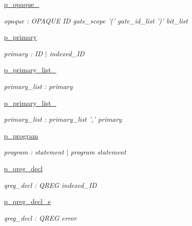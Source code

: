 \begin{DoxyCompactItemize}
\hyperlink{namespaceqat_1_1interop_1_1qasm__parser_1_1OqasmParser_1_1p__opaque__2}{p\-\_\-opaque\-\_}
\begin{DoxyCompactList}\small\item\em opaque \-: O\-P\-A\-Q\-U\-E I\-D gate\-\_\-scope '(' gate\-\_\-id\-\_\-list ')' bit\-\_\-list \end{DoxyCompactList}\item 
\hyperlink{namespaceqat_1_1interop_1_1qasm__parser_1_1OqasmParser_1_1p__primary}{p\-\_\-primary}
\begin{DoxyCompactList}\small\item\em primary \-: I\-D $|$ indexed\-\_\-\-I\-D \end{DoxyCompactList}\item 
\hyperlink{namespaceqat_1_1interop_1_1qasm__parser_1_1OqasmParser_1_1p__primary__list__0}{p\-\_\-primary\-\_\-list\-\_}
\begin{DoxyCompactList}\small\item\em primary\-\_\-list \-: primary \end{DoxyCompactList}\item 
\hyperlink{namespaceqat_1_1interop_1_1qasm__parser_1_1OqasmParser_1_1p__primary__list__1}{p\-\_\-primary\-\_\-list\-\_}
\begin{DoxyCompactList}\small\item\em primary\-\_\-list \-: primary\-\_\-list ',' primary \end{DoxyCompactList}\item 
\hyperlink{namespaceqat_1_1interop_1_1qasm__parser_1_1OqasmParser_1_1p__program}{p\-\_\-program}
\begin{DoxyCompactList}\small\item\em program \-: statement $|$ program statement \end{DoxyCompactList}\item 
\hyperlink{namespaceqat_1_1interop_1_1qasm__parser_1_1OqasmParser_1_1p__qreg__decl}{p\-\_\-qreg\-\_\-decl}
\begin{DoxyCompactList}\small\item\em qreg\-\_\-decl \-: Q\-R\-E\-G indexed\-\_\-\-I\-D \end{DoxyCompactList}\item 
\hyperlink{namespaceqat_1_1interop_1_1qasm__parser_1_1OqasmParser_1_1p__qreg__decl__e}{p\-\_\-qreg\-\_\-decl\-\_\-e}
\begin{DoxyCompactList}\small\item\em qreg\-\_\-decl \-: Q\-R\-E\-G error \end{DoxyCompactList}\item 

\end{DoxyCompactItemize}
